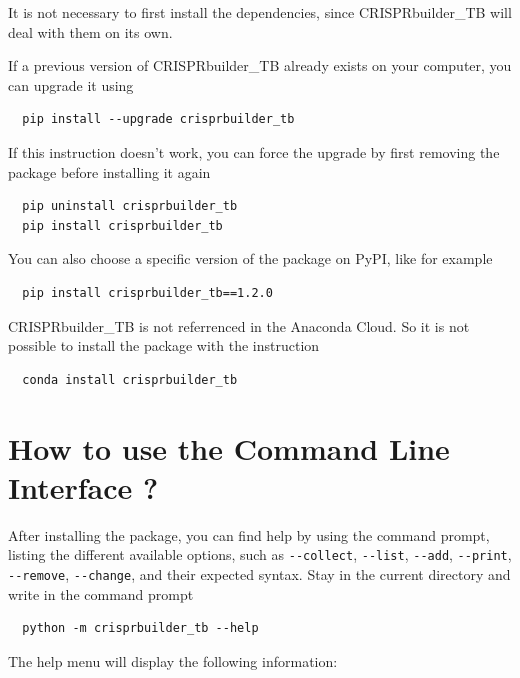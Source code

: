 \documentclass[twoside,a4paper,11pt,frenchb,openany]{report}
\begin{document}
 It is not necessary to first install the dependencies, since CRISPRbuilder\_TB will deal with them on its own.

If a previous version of CRISPRbuilder\_TB already exists on your computer, you can upgrade it using 

\begin{verbatim}
  pip install --upgrade crisprbuilder_tb
\end{verbatim}

If this instruction doesn't work, you can force the upgrade by first removing the package before installing it again

\begin{verbatim}
  pip uninstall crisprbuilder_tb
  pip install crisprbuilder_tb
\end{verbatim}

You can also choose a specific version of the package on PyPI, like for example

\begin{verbatim}
  pip install crisprbuilder_tb==1.2.0
\end{verbatim}

CRISPRbuilder\_TB is not referrenced in the Anaconda Cloud. So it is not possible to install the package with the instruction

\begin{verbatim}
  conda install crisprbuilder_tb
\end{verbatim}


    \section{How to use the Command Line Interface
?}\label{how-to-use-the-command-line-interface}

    After installing the package, you can find help by using the command prompt,
listing the different available options, such as \texttt{-\/-collect},
\texttt{-\/-list}, \texttt{-\/-add}, \texttt{-\/-print},
\texttt{-\/-remove}, \texttt{-\/-change}, and their expected syntax.
Stay in the current directory and write in the
command prompt

    \begin{verbatim}
  python -m crisprbuilder_tb --help
\end{verbatim}

    The help menu will display the following information:
\end{document}
